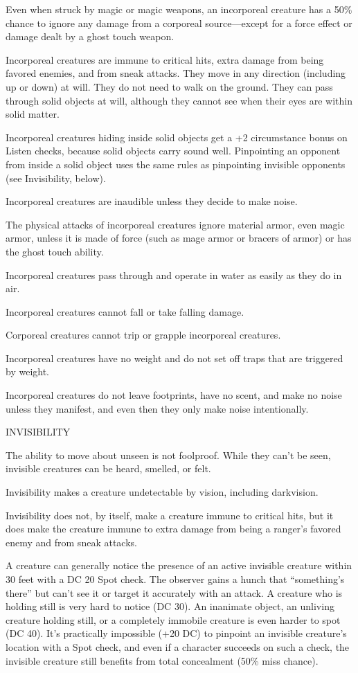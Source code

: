 \documentclass{article}
\begin{document}
Even when struck by magic or magic weapons, an incorporeal creature has a 50\% 
chance to ignore any damage from a corporeal source---except for a force effect\textit{ 
}or damage dealt by a ghost touch weapon.

Incorporeal creatures are immune to critical hits, extra damage from being favored 
enemies, and from sneak attacks. They move in any direction (including up or down) 
at will. They do not need to walk on the ground. They can pass through solid objects 
at will, although they cannot see when their eyes are within solid matter. 

Incorporeal creatures hiding inside solid objects get a +2 circumstance bonus on 
Listen checks, because solid objects carry sound well. Pinpointing an opponent 
from inside a solid object uses the same rules as pinpointing invisible opponents 
(see Invisibility, below). 

Incorporeal creatures are inaudible unless they decide to make noise.

The physical attacks of incorporeal creatures ignore material armor, even magic 
armor, unless it is made of force (such as mage armor or bracers of armor) or has 
the ghost touch ability. 

Incorporeal creatures pass through and operate in water as easily as they do in 
air.

Incorporeal creatures cannot fall or take falling damage.

Corporeal creatures cannot trip or grapple incorporeal creatures. 

Incorporeal creatures have no weight and do not set off traps that are triggered 
by weight.

Incorporeal creatures do not leave footprints, have no scent, and make no noise 
unless they manifest, and even then they only make noise intentionally.

\vspace{12pt}
INVISIBILITY

The ability to move about unseen is not foolproof. While they can't be seen, invisible 
creatures can be heard, smelled, or felt. 

Invisibility makes a creature undetectable by vision, including darkvision.

Invisibility does not, by itself, make a creature immune to critical hits, but 
it does make the creature immune to extra damage from being a ranger's favored 
enemy and from sneak attacks.

A creature can generally notice the presence of an active invisible creature within 
30 feet with a DC 20 Spot check. The observer gains a hunch that ``something's 
there'' but can't see it or target it accurately with an attack. A creature who 
is holding still is very hard to notice (DC 30). An inanimate object, an unliving 
creature holding still, or a completely immobile creature is even harder to spot 
(DC 40). It's practically impossible (+20 DC) to pinpoint an invisible creature's 
location with a Spot check, and even if a character succeeds on such a check, the 
invisible creature still benefits from total concealment (50\% miss chance).
\end{document}
